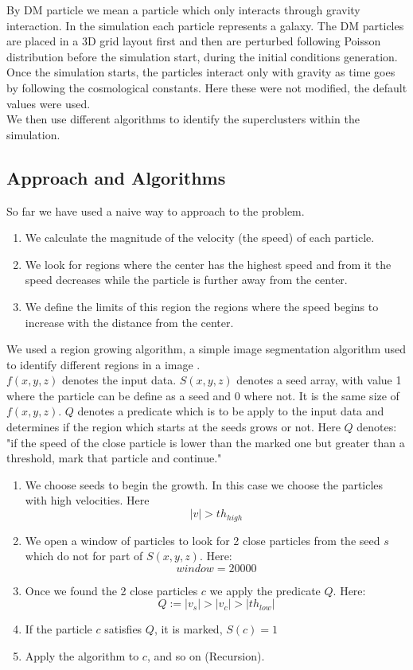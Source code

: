 \documentclass[12pt]{article}
\begin{document}
By DM particle we mean a particle which only interacts through gravity
interaction. In the simulation each particle represents a galaxy. The DM particles are
placed in a 3D grid layout first and then are perturbed following Poisson distribution
before the simulation start, during the initial conditions generation.\\

Once the simulation starts, the particles interact only with gravity as time goes by following the cosmological constants. Here these were not modified, the default values were used.\\

We then use different algorithms to identify the superclusters within the simulation.\\

\subsection{Approach and Algorithms}

So far we have used a naive way to approach to the problem. 
\begin{enumerate}
	\item We calculate the magnitude of the velocity (the speed) of each particle. 
	\item We look for regions where the center has the highest speed and from it the speed decreases while the particle is further away from the center. 
    \item We define the limits of this region the regions where the speed begins to increase with the distance from the center.
\end{enumerate}

We used a region growing algorithm, a simple image segmentation algorithm
used to identify different regions in a image \cite{gonzalez_digital_2008}.\\
$f(x,y,z)$ denotes the input data. $S(x,y,z)$ denotes a seed array, with
value 1 where the particle can be define as a seed and 0 where not. It is the
same size of $f(x,y,z)$. $Q$ denotes a predicate which is to be apply to the
input data and determines if the region which starts at the seeds grows or
not. Here $Q$ denotes: "if the speed of the close particle is lower than the
marked one but greater than a threshold, mark that particle and continue."

\begin{enumerate}
	\item We choose seeds to begin the growth. In this case we choose the particles with high velocities. Here \[ |v|>  th_{high}\]
	\item We open a window of particles to look for 2 close particles from the seed $s$ which do not for part of $S(x,y,z)$. Here:
    \[ window = 20000\]
    \item Once we found the 2 close particles $c$ we apply the predicate $Q$. Here:
    \[ Q := |v_s| > |v_c| > |th_{low}|\]
    
    \item If the particle $c$ satisfies $Q$, it is marked, $S(c) = 1$
    \item Apply the algorithm to $c$, and so on (Recursion).
\end{enumerate}
\end{document}
